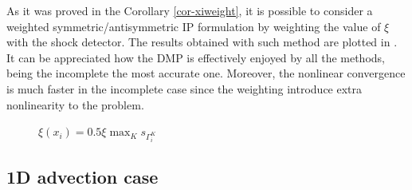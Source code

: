 As it was proved in the Corollary \ref{cor-xiweight}, it is possible to consider a weighted symmetric/antisymmetric IP formulation by weighting the value of $\xi$ with the shock detector. The results obtained with such method are plotted in . It can be appreciated how the DMP is effectively enjoyed by all the methods, being the incomplete the most accurate one. Moreover, the nonlinear convergence is much faster in the incomplete case since the weighting introduce extra nonlinearity to the problem.%
\begin{figure}
\centering
{}%
\caption{$\xi(x_i)=0.5\xi \max_{K} s_{\Gamma_i^K}$}\label{fig-weighxi}
\end{figure}

\subsection{1D advection case}

